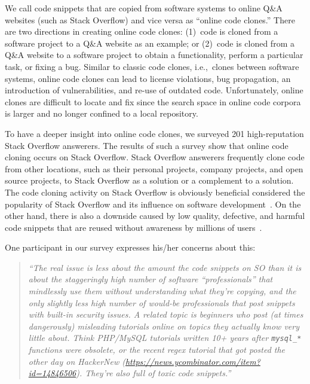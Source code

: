 \documentclass[10pt,journal,compsoc]{IEEEtran}
\begin{document}
We call code snippets that are copied from software systems to online Q\&A
websites (such as Stack Overflow) and vice versa as ``online code clones.''
There are two directions in creating online code clones: (1)~code is cloned from
a software project to a Q\&A website as an example; or (2)~code is cloned from a
Q\&A website to a software project to obtain a functionality, perform a
particular task, or fixing a bug. %
Similar to classic code clones, i.e.,~clones between software systems, online
code clones can lead to license violations, bug propagation, an introduction of
vulnerabilities, and re-use of outdated code. Unfortunately, online clones are
difficult to locate and fix since the search space in online code corpora is
larger and no longer confined to a local repository.

To have a deeper insight into online code clones, we surveyed 201 high-reputation
Stack Overflow answerers. The results of such a survey show that online code
cloning occurs on Stack Overflow. Stack Overflow answerers frequently clone code
from other locations, such as their personal projects, company projects, and
open source projects, to Stack Overflow as a solution or a complement to a
solution. The code cloning activity on Stack Overflow is obviously beneficial
considered the popularity of Stack Overflow and its influence on software
development~\cite{Ponzanelli2013,Ponzanelli2014,Park2014}. On the other hand,
there is also a downside caused by low quality, defective, and harmful code
snippets that are reused without awareness by millions of users~\cite{Zhang2018,Acar2016,Fischer2017}.

One participant in our survey expresses his/her concerns about this:

\begin{quote}
	\textit{``The real issue is less about the amount the code snippets
	on SO than it is about the staggeringly high number of software
	``professionals'' that mindlessly use them without understanding what they're
	copying, and the only slightly less high number of would-be professionals that
	post snippets with built-in security issues.  A related topic is beginners who
	post (at times dangerously) misleading tutorials online on topics they actually
	know very little about. Think PHP/MySQL tutorials written 10+ years after
	\texttt{mysql\_*} functions were obsolete, or the recent regex tutorial that
	got posted the other day on HackerNew
	(\url{https://news.ycombinator.com/item?id=14846506}). They're also full of
	toxic code snippets.''}
\end{quote}
\end{document}

